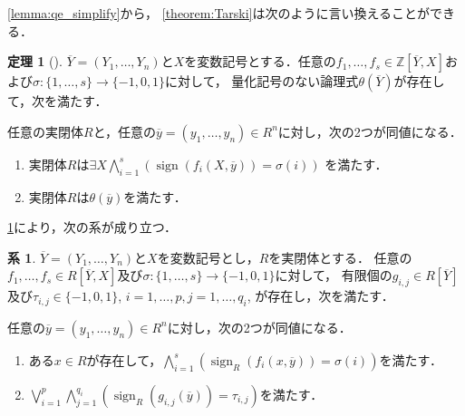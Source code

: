 \documentclass[uplatex, dvipdfmx]{jsarticle}
\numberwithin{equation}{section}
\newcommand{\Z}{\mathbb{Z}}
\newcommand{\map}[3]{{#1}\colon{#2}\rightarrow{#3}}
\DeclareMathOperator{\sign}{sign}
\theoremstyle{definition}
\newtheorem{theorem}[definition]{定理}
\newtheorem{corollary}[definition]{系}
\begin{document}
\cref{lemma:qe_simplify}から，
\cref{theorem:Tarski}は次のように言い換えることができる．

\begin{theorem}[{\cite[Theorem 1.4.2.]{MR1659509}}]\label{theorem:weak_Tarski}
     $\overline{Y} = (Y_1, \dots, Y_n)$と$X$を変数記号とする．任意の$f_1, \dots, f_s \in \Z\left[ \overline{Y},X \right]$および$\map{\sigma}{\{1, \dots, s\}}{\{-1, 0, 1\}}$に対して，
     量化記号のない論理式$\theta\left(\overline{Y}\right)$が存在して，次を満たす．

     任意の実閉体$R$と，任意の$\overline{y} = (y_1, \dots, y_n) \in R^n$に対し，次の2つが同値になる．
     \begin{enumerate}
          \item 実閉体$R$は$\exists X \bigwedge_{i=1}^s (\sign(f_i(X,\overline{y})) = \sigma(i))$ を満たす．
          \item 実閉体$R$は$\theta\left(\overline{y}\right)$を満たす．
     \end{enumerate}
\end{theorem}

\cref{theorem:weak_Tarski}により，次の系が成り立つ．
\begin{corollary}\label{corollary:weak_Tarski}
     $\overline{Y} = (Y_1, \dots, Y_n)$と$X$を変数記号とし，$R$を実閉体とする．
     任意の$f_1, \dots, f_s \in R\left[\overline{Y}, X\right]$及び$\map{\sigma}{\{1, \dots, s\}}{\{-1,0,1\}}$に対して，
     有限個の$g_{i,j} \in R\left[\overline{Y}\right]$及び$\tau_{i,j} \in \{-1, 0, 1\}$, $i=1, \dots, p, j=1, \dots, q_i$, が存在し，次を満たす．

     任意の$\overline{y} = (y_1, \dots, y_n) \in R^n$に対し，次の2つが同値になる．
     \begin{enumerate}
          \item ある$x \in R$が存在して，$\bigwedge_{i=1}^s (\sign_R(f_i(x, \overline{y})) = \sigma(i))$を満たす．
          \item $\bigvee_{i=1}^p \bigwedge_{j=1}^{q_i} (\sign_R(g_{i,j}(\overline{y})) = \tau_{i,j})$を満たす．
     \end{enumerate}
\end{corollary}
\end{document}
